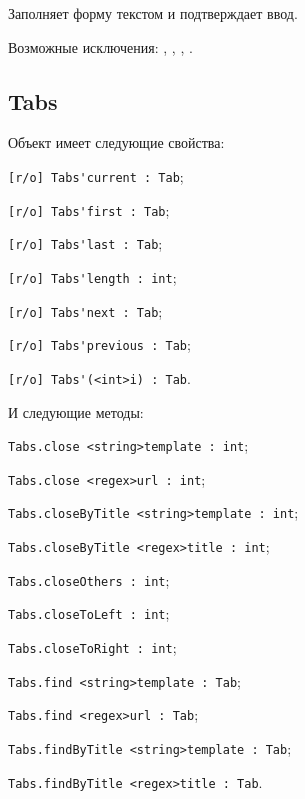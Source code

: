Заполняет форму текстом  и подтверждает ввод.

Возможные исключения: , , , .


\subsection{{\color{orange} Tabs}}

Объект \tabs{} имеет следующие свойства:
\begin{icItems}
	\item \lstinline|[r/o] Tabs'current : Tab|;
	\item \lstinline|[r/o] Tabs'first : Tab|;
	\item \lstinline|[r/o] Tabs'last : Tab|;
	\item \lstinline|[r/o] Tabs'length : int|;
	\item \lstinline|[r/o] Tabs'next : Tab|;
	\item \lstinline|[r/o] Tabs'previous : Tab|;
	\item \lstinline|[r/o] Tabs'(<int>i) : Tab|.
\end{icItems}

И следующие методы:
\begin{icItems}
	\item \lstinline|Tabs.close <string>template : int|;
	\item \lstinline|Tabs.close <regex>url : int|;
	\item \lstinline|Tabs.closeByTitle <string>template : int|;
	\item \lstinline|Tabs.closeByTitle <regex>title : int|;
	\item \lstinline|Tabs.closeOthers : int|;
	\item \lstinline|Tabs.closeToLeft : int|;
	\item \lstinline|Tabs.closeToRight : int|;
	\item \lstinline|Tabs.find <string>template : Tab|;
	\item \lstinline|Tabs.find <regex>url : Tab|;
	\item \lstinline|Tabs.findByTitle <string>template : Tab|;
	\item \lstinline|Tabs.findByTitle <regex>title : Tab|.
\end{icItems}

